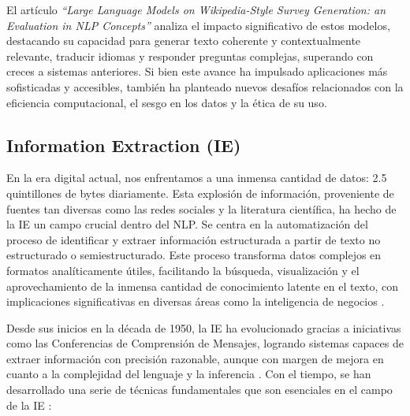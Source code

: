 El artículo \textit{``Large Language Models on Wikipedia-Style Survey Generation: an Evaluation in NLP Concepts''} \cite{Gao2023} 
analiza el impacto significativo de estos modelos, destacando su capacidad para generar 
texto coherente y contextualmente relevante, traducir idiomas y responder preguntas complejas, 
superando con creces a sistemas anteriores. Si bien este avance ha impulsado aplicaciones 
más sofisticadas y accesibles, también ha planteado nuevos desafíos relacionados con 
la eficiencia computacional, el sesgo en los datos y la ética de su uso.


\subsection{Information Extraction (IE)}
En la era digital actual, nos enfrentamos a una inmensa cantidad de datos: 
2.5 quintillones de bytes diariamente. Esta explosión de información, proveniente 
de fuentes tan diversas como las redes sociales y la literatura científica, 
ha hecho de la IE un campo crucial dentro del NLP. Se centra en la automatización 
del proceso de identificar y extraer información estructurada a partir de texto 
no estructurado o semiestructurado. Este proceso transforma datos complejos en 
formatos analíticamente útiles, facilitando la búsqueda, visualización y 
el aprovechamiento de la inmensa cantidad de conocimiento latente en el texto, 
con implicaciones significativas en diversas áreas como la inteligencia de negocios \cite{Gursev2023}.

Desde sus inicios en la década de 1950, la IE ha evolucionado gracias a iniciativas 
como las Conferencias de Comprensión de Mensajes, logrando sistemas capaces de 
extraer información con precisión razonable, aunque con margen de mejora en cuanto 
a la complejidad del lenguaje y la inferencia \cite{Grishman1997}. Con el tiempo, se han 
desarrollado una serie de técnicas fundamentales que son esenciales en el campo de la IE \cite{Geek4geeks2024}:

